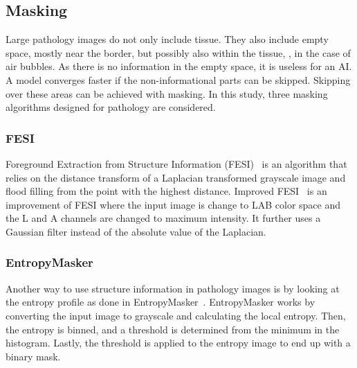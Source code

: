 \subsection{Masking}
Large pathology images do not only include tissue.
They also include empty space, mostly near the border, but possibly also within the tissue, \eg, in the case of air bubbles.
As there is no information in the empty space, it is useless for an AI.
A model converges faster if the non-informational parts can be skipped.
Skipping over these areas can be achieved with masking.
In this study, three masking algorithms designed for pathology are considered.

\subsubsection{FESI}
Foreground Extraction from Structure Information (FESI)~ is an algorithm that relies on the distance transform of a Laplacian transformed grayscale image and flood filling from the point with the highest distance.
Improved FESI~ is an improvement of FESI where the input image is change to LAB color space and the L and A channels are changed to maximum intensity.
It further uses a Gaussian filter instead of the absolute value of the Laplacian.

\subsubsection{EntropyMasker}
Another way to use structure information in pathology images is by looking at the entropy profile as done in EntropyMasker~.
EntropyMasker works by converting the input image to grayscale and calculating the local entropy.
Then, the entropy is binned, and a threshold is determined from the minimum in the histogram.
Lastly, the threshold is applied to the entropy image to end up with a binary mask.
